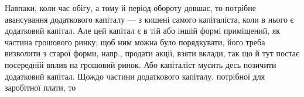 Навпаки, коли час обігу, а тому й період обороту довшає, то потрібне
авансування додаткового капіталу — з кишені самого капіталіста,
коли в нього є додатковий капітал. Але цей капітал є в тій
або іншій формі приміщений, як частина грошового ринку; щоб ним
можна було порядкувати, його треба визволити з старої форми, напр.,
продати акції, взяти вклади, так що й тут постає посередній вплив на
грошовий ринок. Або капіталіст мусить десь позичити додатковий капітал.
Щождо частини додаткового капіталу, потрібної для заробітної плати, то
\parbreak{}  %
